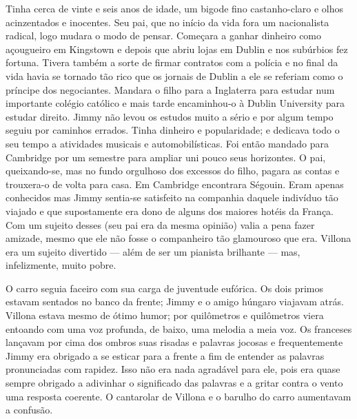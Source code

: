 Tinha cerca de vinte e seis anos de idade, um bigode fino
castanho-claro e olhos acinzentados e inocentes. Seu pai, que no
início da vida fora um nacionalista radical, logo mudara o modo de
pensar. Começara a ganhar dinheiro como açougueiro em Kingstown e
depois que abriu lojas em Dublin e nos subúrbios fez fortuna. Tivera
também a sorte de firmar contratos com a polícia e no final da vida
havia se tornado tão rico que os jornais de Dublin a ele se referiam
como o príncipe dos negociantes. Mandara o filho para a Inglaterra
para estudar num importante colégio católico e mais tarde encaminhou-o
à Dublin University para estudar direito. Jimmy não levou os estudos
muito a sério e por algum tempo seguiu por caminhos errados. Tinha
dinheiro e popularidade; e dedicava todo o seu tempo a atividades
musicais e automobilísticas. Foi então mandado para Cambridge por um
semestre para ampliar uni pouco seus horizontes. O pai, queixando-se,
mas no fundo orgulhoso dos excessos do filho, pagara as contas e
trouxera-o de volta para casa. Em Cambridge encontrara Ségouin. Eram
apenas conhecidos mas Jimmy sentia-se satisfeito na companhia daquele
indivíduo tão viajado e que supostamente era dono de alguns dos
maiores hotéis da França. Com um sujeito desses (seu pai era da mesma
opinião) valia a pena fazer amizade, mesmo que ele não fosse o
companheiro tão glamouroso que era. Villona era um sujeito divertido
--- além de ser um pianista brilhante --- mas, infelizmente, muito
pobre.

O carro seguia faceiro com sua carga de juventude eufórica. Os dois
primos estavam sentados no banco da frente; Jimmy e o
amigo húngaro viajavam atrás. Villona estava mesmo de ótimo humor; por
quilômetros e quilômetros viera entoando com uma voz profunda, de
baixo, uma melodia a meia voz. Os franceses lançavam por cima dos
ombros suas risadas e palavras jocosas e frequentemente Jimmy era
obrigado a se esticar para a frente a fim de entender as palavras
pronunciadas com rapidez. Isso não era nada agradável para ele, pois
era quase sempre obrigado a adivinhar o significado das palavras e a
gritar contra o vento uma resposta coerente. O cantarolar de Villona e
o barulho do carro aumentavam a confusão.

